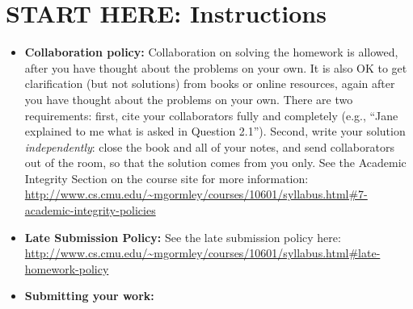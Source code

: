 \documentclass[11pt,addpoints,answers]{exam}
\numberwithin{equation}{section} %
\numberwithin{figure}{section} %
\numberwithin{table}{section} %
\begin{document}
\section*{START HERE: Instructions}
\begin{itemize}
\item \textbf{Collaboration policy:} Collaboration on solving the homework is allowed, after you have thought about the problems on your own. It is also OK to get clarification (but not solutions) from books or online resources, again after you have thought about the problems on your own. There are two requirements: first, cite your collaborators fully and completely (e.g., ``Jane explained to me what is asked in Question 2.1''). Second, write your solution {\em independently}: close the book and all of your notes, and send collaborators out of the room, so that the solution comes from you only.  See the Academic Integrity Section on the course site for more information: \url{http://www.cs.cmu.edu/~mgormley/courses/10601/syllabus.html#7-academic-integrity-policies}

\item\textbf{Late Submission Policy:} See the late submission policy here: \url{http://www.cs.cmu.edu/~mgormley/courses/10601/syllabus.html#late-homework-policy}

\item\textbf{Submitting your work:} 

\begin{itemize}



\end{itemize}
\end{itemize}
\end{document}
